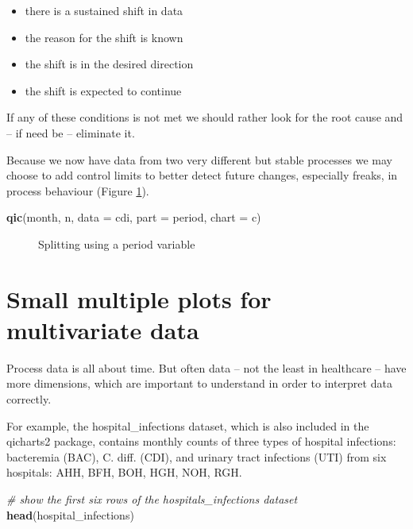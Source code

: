 \documentclass[
]{book}
\makeatletter
\newenvironment{Shaded}{\begin{snugshade}}{\end{snugshade}}
\newcommand{\AttributeTok}[1]{\textcolor[rgb]{0.13,0.29,0.53}{#1}}
\newcommand{\CommentTok}[1]{\textcolor[rgb]{0.56,0.35,0.01}{\textit{#1}}}
\newcommand{\FunctionTok}[1]{\textcolor[rgb]{0.13,0.29,0.53}{\textbf{#1}}}
\newcommand{\NormalTok}[1]{#1}
\newcommand{\StringTok}[1]{\textcolor[rgb]{0.31,0.60,0.02}{#1}}
\newcommand*\pandocbounded[1]{%
  \sbox\pandoc@box{#1}%
  \Gscale@div\@tempa{\textheight}{\dimexpr\ht\pandoc@box+\dp\pandoc@box\relax}%
  \Gscale@div\@tempb{\linewidth}{\wd\pandoc@box}%
  \ifdim\@tempb\p@<\@tempa\p@\let\@tempa\@tempb\fi%
  \ifdim\@tempa\p@<\p@\scalebox{\@tempa}{\usebox\pandoc@box}%
  \else\usebox{\pandoc@box}%
  \fi%
}
\providecommand{\tightlist}{%
  \setlength{\itemsep}{0pt}\setlength{\parskip}{0pt}}
\makeatother
\begin{document}
\begin{itemize}
\tightlist
\item
  there is a sustained shift in data
\item
  the reason for the shift is known
\item
  the shift is in the desired direction
\item
  the shift is expected to continue
\end{itemize}

If any of these conditions is not met we should rather look for the root cause and -- if need be -- eliminate it.

Because we now have data from two very different but stable processes we may choose to add control limits to better detect future changes, especially freaks, in process behaviour (Figure \ref{fig:qicharts-cdi4}).

\begin{Shaded}
\begin{Highlighting}[]
\FunctionTok{qic}\NormalTok{(month, n, }\AttributeTok{data =}\NormalTok{ cdi, }\AttributeTok{part =}\NormalTok{ period, }\AttributeTok{chart =} \StringTok{\textquotesingle{}c\textquotesingle{}}\NormalTok{)}
\end{Highlighting}
\end{Shaded}

\begin{figure}
\centering
\pandocbounded{}
\caption{\label{fig:qicharts-cdi4}Splitting using a period variable}
\end{figure}

\section{Small multiple plots for multivariate data}\label{small-multiple-plots-for-multivariate-data}

Process data is all about time. But often data -- not the least in healthcare -- have more dimensions, which are important to understand in order to interpret data correctly.

For example, the hospital\_infections dataset, which is also included in the qicharts2 package, contains monthly counts of three types of hospital infections: bacteremia (BAC), C. diff. (CDI), and urinary tract infections (UTI) from six hospitals: AHH, BFH, BOH, HGH, NOH, RGH.

\begin{Shaded}
\begin{Highlighting}[]
\CommentTok{\# show the first six rows of the hospitals\_infections dataset}
\FunctionTok{head}\NormalTok{(hospital\_infections)}
\end{Highlighting}
\end{Shaded}
\end{document}
